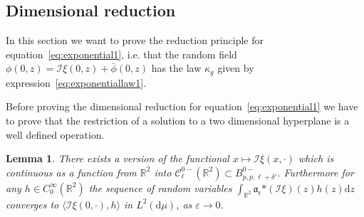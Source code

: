 \documentclass[a4paper,10pt]{article}
\newcommand{\asterisk}{\mathord{*}}
\newcommand{\mathd}{\mathrm{d}}
\newtheorem{lemma}[theorem]{Lemma}
\begin{document}
\subsection{Dimensional reduction}

In this section we want to prove the reduction principle for
equation~{\eqref{eq:exponential1}}, i.e. that the random field $\phi (0, z) =
\mathcal{I} \xi (0, z) + \bar{\phi} (0, z)$ has the law $\kappa_g$ given by
expression~{\eqref{eq:exponentiallaw1}}.

Before proving the dimensional reduction for
equation~{\eqref{eq:exponential1}} we have to prove that the restriction of a
solution to a two dimensional hyperplane is a well defined operation.

\begin{lemma}
  \label{lemma_xi}There exists a version of the functional $x \longmapsto
  \mathcal{I} \xi (x, \cdot)$ which is continuous as a function from
  $\mathbb{R}^2$ into $\mathcal{C}^{0 -}_{\ell} (\mathbb{R}^2) \subset B^{0
  -}_{p, p, \ell + \delta'}$. Furthermore for any $h \in C^{\infty}_0
  (\mathbb{R}^2)$ the sequence of random variables $\int_{\mathbb{R}^2}
  \mathfrak{a}_{\epsilon} \asterisk (\mathcal{I} \xi) (z) h (z) \mathd z$
  converges to $\langle \mathcal{I} \xi (0, \cdot), h \rangle$ in $L^2 (\mathd
  \mu)$, as $\varepsilon \rightarrow 0$.
\end{lemma}
\end{document}

